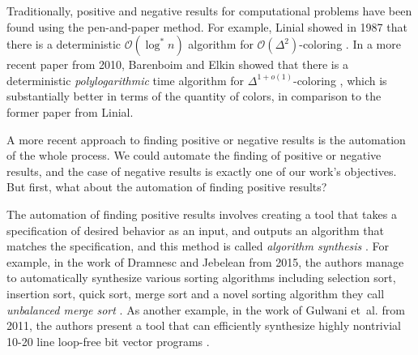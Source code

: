 Traditionally, positive and negative results for computational problems have been found using the pen-and-paper method.
For example, Linial showed in 1987 that there is a deterministic \(\mathcal{O}(\log^* n)\) algorithm for \(\mathcal{O}(\Delta^2)\)-coloring \cite{DBLP:conf/focs/Linial87}.
In a more recent paper from 2010, Barenboim and Elkin showed that there is a deterministic \emph{polylogarithmic} time algorithm for \(\Delta^{1 + o(1)}\)-coloring \cite{DBLP:conf/podc/BarenboimE10}, which is substantially better in terms of the quantity of colors, in comparison to the former paper \cite{DBLP:conf/focs/Linial87} from Linial.

A more recent approach to finding positive or negative results is the automation of the whole process.
We could automate the finding of positive or negative results, and the case of negative results is exactly one of our work's objectives.
But first, what about the automation of finding positive results?

The automation of finding positive results involves creating a tool that takes a specification of desired behavior as an input, and outputs an algorithm that matches the specification, and this method is called \emph{algorithm synthesis} \cite{DBLP:phd/basesearch/Rybicki16}.
For example, in the work of Dramnesc and Jebelean from 2015, the authors manage to automatically synthesize various sorting algorithms including selection sort, insertion sort, quick sort, merge sort and a novel sorting algorithm they call \emph{unbalanced merge sort} \cite{DBLP:journals/jsc/DramnescJ15}.
As another example, in the work of Gulwani et~al. from 2011, the authors present a tool that can efficiently synthesize highly nontrivial 10-20 line loop-free bit vector programs \cite{DBLP:conf/pldi/GulwaniJTV11}.




%
%
%
